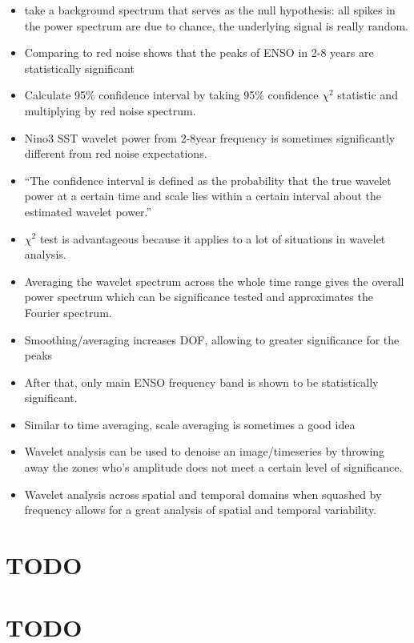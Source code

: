 \documentclass[11pt]{article}
\begin{document}
\begin{itemize}
\item take a background spectrum that serves as the null hypothesis: all spikes in the power spectrum are due to chance, the underlying signal is really random.
\item Comparing to red noise shows that the peaks of ENSO in 2-8 years are statistically significant
\item Calculate 95\% confidence interval by taking 95\% confidence \(\chi^2\) statistic and multiplying by red noise spectrum.
\item Nino3 SST wavelet power from 2-8year frequency is sometimes significantly different from red noise expectations.
\item ``The confidence interval is defined as the probability that the true wavelet power at a certain time and scale lies within a certain interval about the estimated wavelet power.''
\item \(\chi^2\) test is advantageous because it applies to a lot of situations in wavelet analysis.
\item Averaging the wavelet spectrum across the whole time range gives the overall power spectrum which can be significance tested and approximates the Fourier spectrum.
\item Smoothing/averaging increases DOF, allowing to greater significance for the peaks
\item After that, only main ENSO frequency band is shown to be statistically significant.
\item Similar to time averaging, scale averaging is sometimes a good idea
\item Wavelet analysis can be used to denoise an image/timeseries by throwing away the zones who's amplitude does not meet a certain level of significance.
\item Wavelet analysis across spatial and temporal domains when squashed by frequency allows for a great analysis of spatial and temporal variability.
\end{itemize}

\section{{\bfseries\sffamily TODO} \cite{vecchi2006weakening}}
\label{sec:orgb996a82}
\section{\cite{vega2017analysis}}
\label{sec:orga1fc1a2}
\section{{\bfseries\sffamily TODO} \cite{wang2016nino}}
\label{sec:orge694acd}
\end{document}
